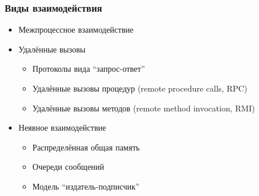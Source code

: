 \documentclass[xetex,mathserif,serif]{beamer}
\begin{document}
    \begin{frame}
        \frametitle{Виды взаимодействия}
        \begin{itemize}
            \item Межпроцессное взаимодействие
            \item Удалённые вызовы
            \begin{itemize}
                \item Протоколы вида ``запрос-ответ''
                \item Удалённые вызовы процедур (remote procedure calls, RPC)
                \item Удалённые вызовы методов (remote method invocation, RMI)
            \end{itemize}
            \item Неявное взаимодействие
            \begin{itemize}
                \item Распределённая общая память
                \item Очереди сообщений
                \item Модель ``издатель-подписчик''
            \end{itemize}
        \end{itemize}
    \end{frame}
\end{document}
